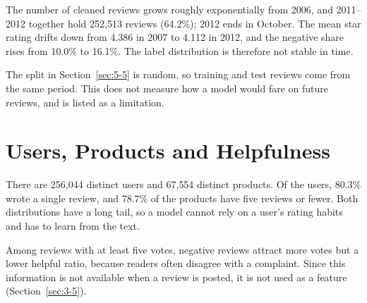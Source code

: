\begin{center}
\end{center}

The number of cleaned reviews grows roughly exponentially from 2006, and 2011--2012 together hold 252{,}513 reviews (64.2\%); 2012 ends in October. The mean star rating drifts down from 4.386 in 2007 to 4.112 in 2012, and the negative share rises from 10.0\% to 16.1\%. The label distribution is therefore not stable in time.

The split in Section~\ref{sec:5-5} is random, so training and test reviews come from the same period. This does not measure how a model would fare on future reviews, and is listed as a limitation.

\section{Users, Products and Helpfulness}
\label{sec:4-6}

There are 256{,}044 distinct users and 67{,}554 distinct products. Of the users, 80.3\% wrote a single review, and 78.7\% of the products have five reviews or fewer. Both distributions have a long tail, so a model cannot rely on a user's rating habits and has to learn from the text.

Among reviews with at least five votes, negative reviews attract more votes but a lower helpful ratio, because readers often disagree with a complaint. Since this information is not available when a review is posted, it is not used as a feature (Section~\ref{sec:3-5}).


